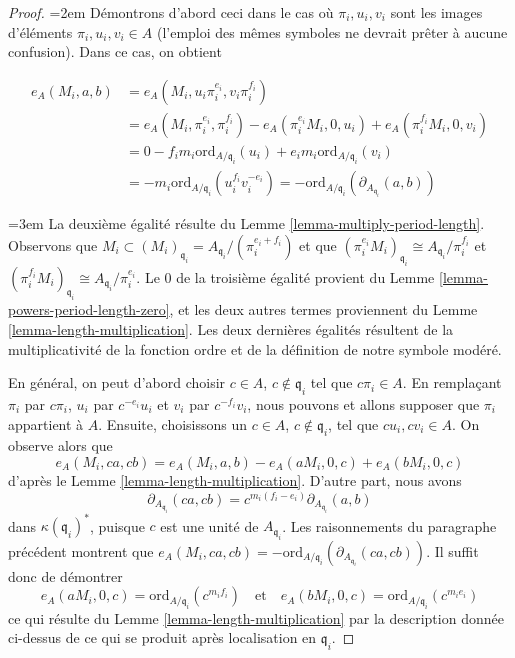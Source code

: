 \begin{proof}
{\emergencystretch=2em\medskip\noindent
Démontrons d'abord ceci dans le cas où $\pi_i, u_i, v_i$ sont les images
d'éléments $\pi_i, u_i, v_i \in A$ (l'emploi des mêmes symboles
ne devrait prêter à aucune confusion). Dans ce cas, on obtient\par}
\begin{align*}
e_A(M_i, a, b) & =
e_A(M_i, u_i\pi_i^{e_i}, v_i\pi_i^{f_i}) \\
& =
e_A(M_i, \pi_i^{e_i}, \pi_i^{f_i}) -
e_A(\pi_i^{e_i}M_i, 0, u_i) +
e_A(\pi_i^{f_i}M_i, 0, v_i) \\
& =
0 -
f_im_i\text{ord}_{A/\mathfrak q_i}(u_i) +
e_im_i\text{ord}_{A/\mathfrak q_i}(v_i) \\
& =
-m_i\text{ord}_{A/\mathfrak q_i}(u_i^{f_i}v_i^{-e_i}) =
-\text{ord}_{A/\mathfrak q_i}(\partial_{A_{\mathfrak q_i}}(a, b))
\end{align*}
{\emergencystretch=3em La deuxième égalité résulte du Lemme \ref{lemma-multiply-period-length}.
Observons que
$M_i \subset (M_i)_{\mathfrak q_i} = A_{\mathfrak q_i}/(\pi_i^{e_i + f_i})$
et que
$(\pi_i^{e_i}M_i)_{\mathfrak q_i} \cong A_{\mathfrak q_i}/\pi_i^{f_i}$ et
$(\pi_i^{f_i}M_i)_{\mathfrak q_i} \cong A_{\mathfrak q_i}/\pi_i^{e_i}$.
Le $0$ de la troisième égalité provient du
Lemme \ref{lemma-powers-period-length-zero},
et les deux autres termes proviennent du
Lemme \ref{lemma-length-multiplication}.
Les deux dernières égalités résultent de la multiplicativité de
la fonction ordre et de la définition de notre symbole modéré.\par}

\medskip\noindent
En général, on peut d'abord choisir $c \in A$, $c \not \in \mathfrak q_i$
tel que $c\pi_i \in A$. En remplaçant $\pi_i$ par $c\pi_i$,
$u_i$ par $c^{-e_i}u_i$ et $v_i$ par $c^{-f_i}v_i$,
nous pouvons et allons supposer que $\pi_i$ appartient à $A$.
Ensuite, choisissons un $c \in A$, $c \not \in \mathfrak q_i$,
tel que $cu_i, cv_i \in A$. On observe alors que
$$
e_A(M_i, ca, cb) = e_A(M_i, a, b) - e_A(aM_i, 0, c) + e_A(bM_i, 0, c)
$$
d'après le Lemme \ref{lemma-length-multiplication}.
D'autre part, nous avons
$$
\partial_{A_{\mathfrak q_i}}(ca, cb) =
c^{m_i(f_i - e_i)}\partial_{A_{\mathfrak q_i}}(a, b)
$$
dans $\kappa(\mathfrak q_i)^*$, puisque $c$ est une unité de $A_{\mathfrak q_i}$.
Les raisonnements du paragraphe précédent montrent que
$e_A(M_i, ca, cb) = -
\text{ord}_{A/\mathfrak q_i}(\partial_{A_{\mathfrak q_i}}(ca, cb))$.
Il suffit donc de démontrer
$$
e_A(aM_i, 0, c) = \text{ord}_{A/\mathfrak q_i}(c^{m_if_i})
\quad\text{et}\quad
e_A(bM_i, 0, c) = \text{ord}_{A/\mathfrak q_i}(c^{m_ie_i})
$$
ce qui résulte du Lemme \ref{lemma-length-multiplication}
par la description donnée ci-dessus de ce qui se produit
après localisation en $\mathfrak q_i$.
\end{proof}

